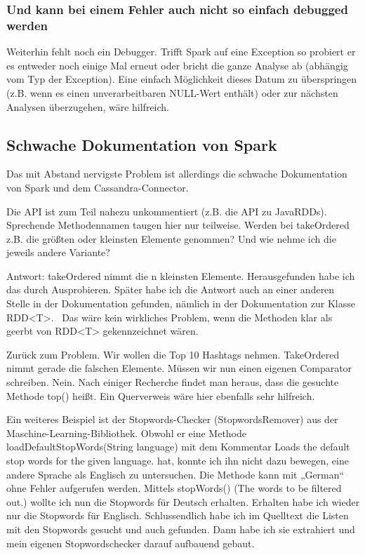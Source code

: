 \subsubsection{Und kann bei einem Fehler auch nicht
so einfach debugged werden}
Weiterhin fehlt noch ein Debugger. Trifft Spark auf eine Exception so
probiert er es entweder noch einige Mal erneut oder bricht die ganze
Analyse ab (abhängig vom Typ der Exception). Eine einfach Möglichkeit
dieses Datum zu überspringen (z.B. wenn es einen unverarbeitbaren
NULL-Wert enthält) oder zur nächsten Analysen überzugehen, wäre
hilfreich.

\subsection{Schwache Dokumentation von Spark}
Das mit Abstand nervigste Problem ist allerdings die schwache
Dokumentation von Spark und dem Cassandra-Connector.

Die API ist zum Teil nahezu unkommentiert (z.B. die API zu JavaRDDs).
Sprechende Methodennamen taugen hier nur teilweise. Werden bei
takeOrdered z.B. die größten oder kleinsten Elemente genommen? Und wie
nehme ich die jeweils andere Variante?

Antwort: takeOrdered nimmt die n kleinsten Elemente. Herausgefunden habe
ich das durch Ausprobieren. Später habe ich die Antwort auch an einer
anderen Stelle in der Dokumentation gefunden, nämlich in der
Dokumentation zur Klasse RDD{\textless}T{\textgreater}. \ Das wäre kein
wirkliches Problem, wenn die Methoden klar als geerbt von
RDD{\textless}T{\textgreater} gekennzeichnet wären.

Zurück zum Problem. Wir wollen die Top 10 Hashtags nehmen. TakeOrdered
nimmt gerade die falschen Elemente. Müssen wir nun einen eigenen
Comparator schreiben. Nein. Nach einiger Recherche findet man heraus,
dass die gesuchte Methode top() heißt. Ein Querverweis wäre hier
ebenfalls sehr hilfreich.

Ein weiteres Beispiel ist der Stopwords-Checker (StopwordsRemover) aus
der Maschine-Learning-Bibliothek. Obwohl er eine Methode
loadDefaultStopWords(String language) mit dem Kommentar Loads the
default stop words for the given language. hat, konnte ich ihn nicht
dazu bewegen, eine andere Sprache als Englisch zu untersuchen. Die
Methode kann mit „German“ ohne Fehler aufgerufen werden. Mittels
stopWords() (The words to be filtered out.) wollte ich nun die
Stopwords für Deutsch erhalten. Erhalten habe ich wieder nur die
Stopwords für Englisch. Schlussendlich habe ich im Quelltext die Listen
mit den Stopwords gesucht und auch gefunden. Dann habe ich sie
extrahiert und mein eigenen Stopwordschecker darauf aufbauend gebaut.


